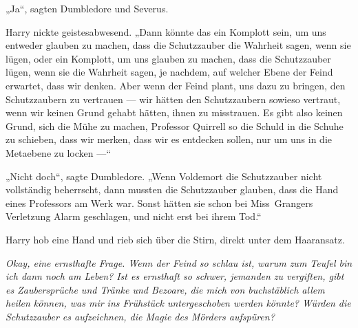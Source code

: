 „Ja“, sagten Dumbledore und Severus.

Harry nickte geistesabwesend.
„Dann könnte das ein Komplott sein, um uns entweder glauben zu machen, dass die Schutzzauber die Wahrheit sagen, wenn sie lügen, oder ein Komplott, um uns glauben zu machen, dass die Schutzzauber lügen, wenn sie die Wahrheit sagen, je nachdem, auf welcher Ebene der Feind erwartet, dass wir denken. Aber wenn der Feind plant, uns dazu zu bringen, den Schutzzaubern zu vertrauen — wir hätten den Schutzzaubern sowieso vertraut, wenn wir keinen Grund gehabt hätten, ihnen zu misstrauen. Es gibt also keinen Grund, sich die Mühe zu machen, Professor Quirrell so die Schuld in die Schuhe zu schieben, dass wir merken, dass wir es entdecken sollen, nur um uns in die Metaebene zu locken —“

„Nicht doch“, sagte Dumbledore.
„Wenn Voldemort die Schutzzauber nicht vollständig beherrscht, dann mussten die Schutzzauber glauben, dass die Hand eines Professors am Werk war. Sonst hätten sie schon bei Miss~Grangers Verletzung Alarm geschlagen, und nicht erst bei ihrem Tod.“

Harry hob eine Hand und rieb sich über die Stirn, direkt unter dem Haaransatz.

\emph{Okay, eine ernsthafte Frage. Wenn der Feind so schlau ist, warum zum Teufel bin ich dann noch am Leben? Ist es ernsthaft so schwer, jemanden zu vergiften, gibt es Zaubersprüche und Tränke und Bezoare, die mich von buchstäblich allem heilen können, was mir ins Frühstück untergeschoben werden könnte? Würden die Schutzzauber es aufzeichnen, die Magie des Mörders aufspüren?}

